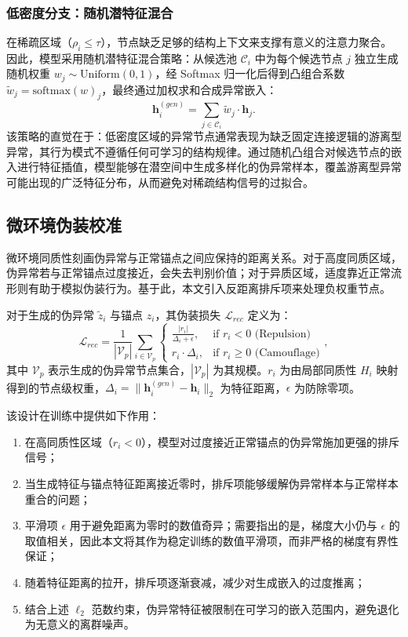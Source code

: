 ﻿﻿﻿﻿    \documentclass[conference, onecolumn]{IEEEtran}
\begin{document}
    \subsubsection{低密度分支：随机潜特征混合}
    在稀疏区域（$\rho_i \le \tau$），节点缺乏足够的结构上下文来支撑有意义的注意力聚合。因此，模型采用随机潜特征混合策略：从候选池 $\mathcal{C}_i$ 中为每个候选节点 $j$ 独立生成随机权重 $w_j \sim \text{Uniform}(0,1)$，经 Softmax 归一化后得到凸组合系数 $\tilde{w}_j = \text{softmax}(w)_j$，最终通过加权求和合成异常嵌入：
    \begin{equation}
    \mathbf{h}^{(gen)}_i = \sum_{j \in \mathcal{C}_i} \tilde{w}_j \cdot \mathbf{h}_j.
    \end{equation}
    该策略的直觉在于：低密度区域的异常节点通常表现为缺乏固定连接逻辑的游离型异常，其行为模式不遵循任何可学习的结构规律。通过随机凸组合对候选节点的嵌入进行特征插值，模型能够在潜空间中生成多样化的伪异常样本，覆盖游离型异常可能出现的广泛特征分布，从而避免对稀疏结构信号的过拟合。

    \subsection{微环境伪装校准}
    微环境同质性刻画伪异常与正常锚点之间应保持的距离关系。对于高度同质区域，伪异常若与正常锚点过度接近，会失去判别价值；对于异质区域，适度靠近正常流形则有助于模拟伪装行为。基于此，本文引入反距离排斥项来处理负权重节点。

    对于生成的伪异常 $\tilde{z}_i$ 与锚点 $z_i$，其伪装损失 $\mathcal{L}_{rec}$ 定义为：
    \begin{equation}
    \mathcal{L}_{rec} = \frac{1}{|\mathcal{V}_p|} \sum_{i \in \mathcal{V}_p} \begin{cases}
    \frac{|r_i|}{\Delta_i + \epsilon}, & \text{if } r_i < 0 \text{ (Repulsion)} \\
    r_i \cdot \Delta_i, & \text{if } r_i \ge 0 \text{ (Camouflage)}
    \end{cases},
    \end{equation}
    其中 $\mathcal{V}_p$ 表示生成的伪异常节点集合，$|\mathcal{V}_p|$ 为其规模。$r_i$ 为由局部同质性 $H_i$ 映射得到的节点级权重，$\Delta_i = \|\mathbf{h}^{(gen)}_i - \mathbf{h}_i\|_2$ 为特征距离，$\epsilon$ 为防除零项。

    该设计在训练中提供如下作用：
    \begin{enumerate}
        \item 在高同质性区域（$r_i < 0$），模型对过度接近正常锚点的伪异常施加更强的排斥信号；
        \item 当生成特征与锚点特征距离接近零时，排斥项能够缓解伪异常样本与正常样本重合的问题；
        \item 平滑项 $\epsilon$ 用于避免距离为零时的数值奇异；需要指出的是，梯度大小仍与 $\epsilon$ 的取值相关，因此本文将其作为稳定训练的数值平滑项，而非严格的梯度有界性保证；
        \item 随着特征距离的拉开，排斥项逐渐衰减，减少对生成嵌入的过度推离；
        \item 结合上述 $\ell_2$ 范数约束，伪异常特征被限制在可学习的嵌入范围内，避免退化为无意义的离群噪声。
    \end{enumerate}
\end{document}
